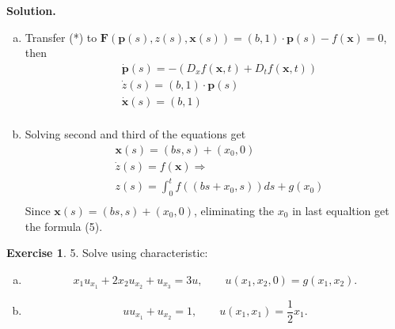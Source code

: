 \documentclass[a4paper]{book}
\newenvironment{solution}%
{\noindent\textbf{Solution.}}%
{\qedhere}
\numberwithin{equation}{chapter}
\theoremstyle{definition}
\newtheorem{exc}[exm]{Exercise}
\begin{document}
\begin{solution}
  \begin{enumerate}[(a)]
  \item Transfer (*) to $\mathbf{F}(\mathbf{p}(s),z(s),\mathbf{x}(s)) = (b,1)\cdot\mathbf{p}(s) - f(\mathbf{x}) = 0 $, then
    \begin{align*}
      &\dot{\mathbf{p}}(s) = - (D_x f(\mathbf{x},t) + D_t f(\mathbf{x},t)) \\
      &\dot{z}(s) = (b,1) \cdot \mathbf{p}(s) \\
      &\dot{\mathbf{x}}(s) = (b,1) \\
    \end{align*}

  \item Solving second and third of the equations get
    \begin{align*}
      &\mathbf{x}(s) = (bs,s) + (x_0,0) \\
      &\dot{z}(s) = f(\mathbf{x}) \Longrightarrow \\
      &z(s) = \int_0^t f((bs + x_0,s))ds + g(x_0) \\
    \end{align*}
    Since $\mathbf{x}(s) = (bs,s) + (x_0,0)$, eliminating the $x_0$ in last equaltion get the formula (5). 
  \end{enumerate}
\end{solution}

\begin{exc}
  5.  Solve using characteristic:
  \begin{enumerate} [(a)]
  \item
    \begin{equation}
      \label{eq:6:4:1}
      x_1 u_{x_1} + 2 x_2 u_{x_2} + u_{x_3} = 3u, \qquad u(x_1, x_2, 0) = g(x_1, x_2).
    \end{equation}

    \item
      \begin{equation}
        \label{eq:6:4:2}
        u u_{x_1} + u_{x_2} = 1, \qquad u(x_1, x_1) = \frac{1}{2} x_1.
      \end{equation}

  \end{enumerate}
\end{exc}
\end{document}
